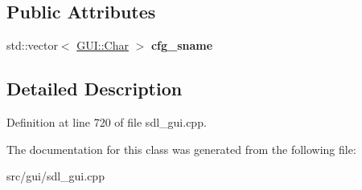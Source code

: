 \subsection*{Public Attributes}
\begin{DoxyCompactItemize}
\item 
\hypertarget{classSectionEditor_a4c40dec1763778f36a54ccbb5f0b264b}{std\-::vector$<$ \hyperlink{namespaceGUI_af6b04b46d40197b4f00e553d7d1a3e4c}{G\-U\-I\-::\-Char} $>$ {\bfseries cfg\-\_\-sname}}\label{classSectionEditor_a4c40dec1763778f36a54ccbb5f0b264b}

\end{DoxyCompactItemize}


\subsection{Detailed Description}


Definition at line 720 of file sdl\-\_\-gui.\-cpp.



The documentation for this class was generated from the following file\-:\begin{DoxyCompactItemize}
\item 
src/gui/sdl\-\_\-gui.\-cpp\end{DoxyCompactItemize}
